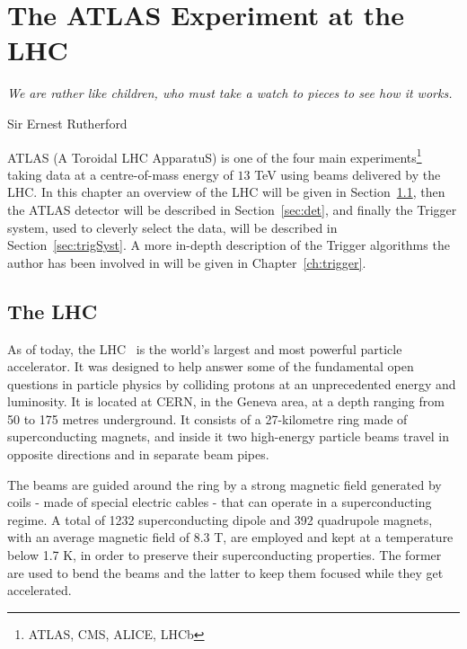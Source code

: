\chapter{The ATLAS Experiment at the LHC}
\label{ch:detector}
\epigraph{\emph{We are rather like children, who must take a watch to pieces to see how it works.}}{Sir Ernest Rutherford}

	\ac{ATLAS} (A Toroidal LHC ApparatuS) is one of the four main experiments\footnote{\ac{ATLAS}, \ac{CMS}, \ac{ALICE}, \ac{LHCb}} taking data at a centre-of-mass energy of $13$ TeV using beams delivered by the \ac{LHC}. In this chapter an overview of the \ac{LHC} will be given in Section~\ref{sec:lhc}, then the \ac{ATLAS} detector will be described in Section~\ref{sec:det}, and finally the Trigger system, used to cleverly select the data, will be described in Section~\ref{sec:trigSyst}. A more in-depth description of the Trigger algorithms the author has been involved in will be given in Chapter~\ref{ch:trigger}.


	\section{The LHC}
	\label{sec:lhc}
	
		As of today, the \ac{LHC}~\cite{LHCDesignReport} is the world’s largest and most powerful particle accelerator. It was designed to help answer some of the fundamental open questions in particle physics by colliding protons at an unprecedented energy and luminosity. It is located at \ac{CERN}, in the Geneva area, at a depth ranging from 50 to 175 metres underground. It consists of a 27-kilometre ring made of superconducting magnets, and inside it two high-energy particle beams travel in opposite directions and in separate beam pipes. 

		The beams are guided around the ring by a strong magnetic field generated by coils - made of special electric cables - that can operate in a superconducting regime. A total of 1232 superconducting dipole and 392 quadrupole magnets, with an average magnetic field of 8.3 T, are employed and kept at a temperature below 1.7 K, in order to preserve their superconducting properties. The former are used to bend the beams and the latter to keep them focused while they get accelerated. 
		
